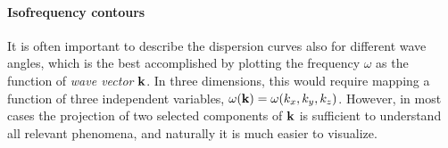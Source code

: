 
\paragraph{Isofrequency contours}  %
It is often important to describe the dispersion curves also for different wave angles, which is the best accomplished by plotting the  %
frequency $\omega$ as the function of \textit{wave vector} ${\mathbf{k}}$. In three dimensions, this would require mapping a function of three independent variables, $\omega({\mathbf{k}}) = \omega(k_x, k_y, k_z)$. However, in most cases the projection of two selected components of ${\mathbf{k}}$ is sufficient to understand all relevant phenomena, and naturally it is much easier to visualize. 
